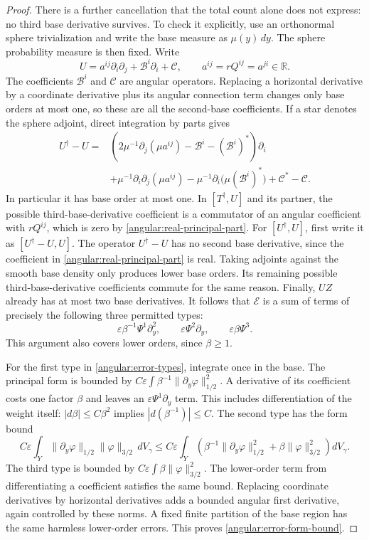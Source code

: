 \documentclass[11pt,a4paper]{article}
\newcommand{\eps}{\varepsilon}
\numberwithin{equation}{section}
\begin{document}
\begin{proof}
There is a further cancellation that the total count alone does not
express: no third base derivative survives.  To check it explicitly,
use an orthonormal sphere trivialization and write the base measure as
$\mu(y)\,dy$.  The sphere probability measure is then fixed.  Write
\[
 U=a^{ij}\partial_i\partial_j+\mathcal B^i\partial_i+\mathcal C,
 \qquad a^{ij}=rQ^{ij}=a^{ji}\in\mathbb R.
\]
The coefficients $\mathcal B^i$ and $\mathcal C$ are angular
operators.  Replacing a horizontal derivative by a coordinate derivative
plus its angular connection term changes only base orders at most one,
so these are all the second-base coefficients.  If a star denotes the
sphere adjoint, direct integration by parts gives
\begin{align*}
 U^\dagger-U
 ={}&\left(2\mu^{-1}\partial_j(\mu a^{ij})
                -\mathcal B^i-(\mathcal B^i)^*\right)\partial_i\\
 &+\mu^{-1}\partial_i\partial_j(\mu a^{ij})
       -\mu^{-1}\partial_i\bigl(\mu(\mathcal B^i)^*\bigr)
       +\mathcal C^*-\mathcal C.
\end{align*}
In particular it has base order at most one.
In $[T^\dagger,U]$ and
its partner, the possible third-base-derivative coefficient is a commutator of an angular coefficient
with $rQ^{ij}$, which is zero by
\eqref{angular:real-principal-part}.  For $[U^\dagger,U]$, first write
it as $[U^\dagger-U,U]$.  The operator $U^\dagger-U$ has no second base
derivative, since the coefficient in
\eqref{angular:real-principal-part} is real.  Taking adjoints against
the smooth base density only produces lower base orders.  Its remaining
possible third-base-derivative coefficients commute for the same reason.
Finally, $UZ$ already has at most two base derivatives.
It follows that $\mathcal E$ is a sum of terms of precisely the following
three permitted types:
\begin{equation}\label{angular:error-types}
 \eps\beta^{-1}\Psi^1\partial_y^2,
 \qquad \eps\Psi^2\partial_y,
 \qquad \eps\beta\Psi^3.
\end{equation}
This argument also covers lower orders, since $\beta\ge1$.

For the first type in \eqref{angular:error-types}, integrate once in the
base.  The principal form is bounded by
$C\eps\int\beta^{-1}\|\partial_y\varphi\|_{1/2}^2$.
A derivative of its coefficient costs one factor $\beta$ and leaves an
$\eps\Psi^1\partial_y$ term.  This includes differentiation of the
weight itself: $|d\beta|\le C\beta^2$ implies
$|d(\beta^{-1})|\le C$.  The second type has the form bound
\[
 C\eps\int_Y
     \|\partial_y\varphi\|_{1/2}\|\varphi\|_{3/2}\,dV_\gamma
 \le C\eps\int_Y\left(
     \beta^{-1}\|\partial_y\varphi\|_{1/2}^2
                 +\beta\|\varphi\|_{3/2}^2\right)dV_\gamma.
\]
The third type is bounded by
$C\eps\int\beta\|\varphi\|_{3/2}^2$.
The lower-order term from differentiating a coefficient satisfies the
same bound.  Replacing coordinate derivatives by horizontal derivatives
adds a bounded angular first derivative, again controlled by these norms.
A fixed finite partition of the base region has the same harmless
lower-order errors.  This proves \eqref{angular:error-form-bound}.


\end{proof}
\end{document}
